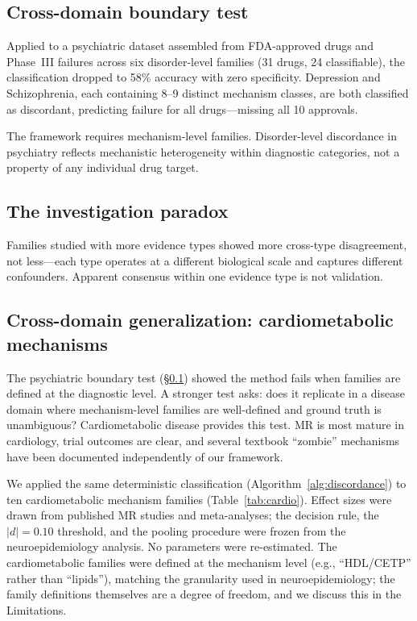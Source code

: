 \documentclass[11pt]{article}
\begin{document}
\subsection{Cross-domain boundary test}
\label{sec:boundary}

Applied to a psychiatric dataset assembled from FDA-approved drugs and Phase~III failures across six disorder-level families (31 drugs, 24 classifiable), the classification dropped to 58\% accuracy with zero specificity. Depression and Schizophrenia, each containing 8--9 distinct mechanism classes, are both classified as discordant, predicting failure for all drugs---missing all 10 approvals.

The framework requires mechanism-level families. Disorder-level discordance in psychiatry reflects mechanistic heterogeneity within diagnostic categories, not a property of any individual drug target.

\subsection{The investigation paradox}

Families studied with more evidence types showed more cross-type disagreement, not less---each type operates at a different biological scale and captures different confounders. Apparent consensus within one evidence type is not validation.

\subsection{Cross-domain generalization: cardiometabolic mechanisms}
\label{sec:cardio}

The psychiatric boundary test (\S\ref{sec:boundary}) showed the method fails when families are defined at the diagnostic level. A stronger test asks: does it replicate in a disease domain where mechanism-level families are well-defined and ground truth is unambiguous? Cardiometabolic disease provides this test. MR is most mature in cardiology, trial outcomes are clear, and several textbook ``zombie'' mechanisms have been documented independently of our framework.

We applied the same deterministic classification (Algorithm~\ref{alg:discordance}) to ten cardiometabolic mechanism families (Table~\ref{tab:cardio}). Effect sizes were drawn from published MR studies and meta-analyses; the decision rule, the $|d| = 0.10$ threshold, and the pooling procedure were frozen from the neuroepidemiology analysis. No parameters were re-estimated. The cardiometabolic families were defined at the mechanism level (e.g., ``HDL/CETP'' rather than ``lipids''), matching the granularity used in neuroepidemiology; the family definitions themselves are a degree of freedom, and we discuss this in the Limitations.
\end{document}
